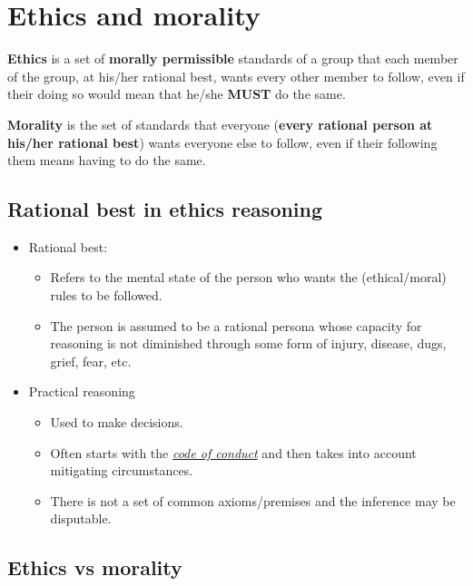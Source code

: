 \documentclass{article}
\newcommand{\worddef}[1]{\hyperref[sec:reference]{\textit{#1}}}
\begin{document}
\section{Ethics and morality}
\begin{flushleft}
\textbf{Ethics} is a set of \textbf{morally permissible} standards of a group that each member of the group, at his/her rational best, wants every other member to follow, even if their doing so would mean that he/she \textbf{MUST} do the same.

\bigskip

\textbf{Morality} is the set of standards that everyone (\textbf{every rational person at his/her rational best}) wants everyone else to follow, even if their following them means having to do the same.
\end{flushleft}

\subsection{Rational best in ethics reasoning}
\begin{itemize}
  \item Rational best:
  \begin{itemize}
    \item Refers to the mental state of the person who wants the (ethical/moral) rules to be followed.
    \item The person is assumed to be a rational persona whose capacity for reasoning is
not diminished through some form of injury, disease, dugs, grief, fear, etc. 
  \end{itemize}
  \item Practical reasoning
  \begin{itemize}
    \item Used to make decisions.
    \item Often starts with the \worddef{code of conduct} and then takes into account mitigating circumstances.
    \item There is not a set of common axioms/premises and the inference may be disputable.  
  \end{itemize}
\end{itemize}

\subsection{Ethics vs morality}
\end{document}
